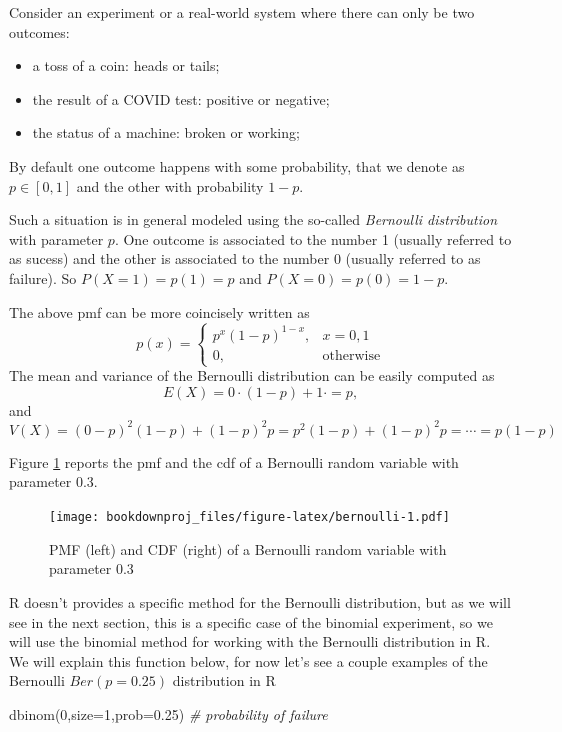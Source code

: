 \documentclass[
]{book}
\newenvironment{Shaded}{\begin{snugshade}}{\end{snugshade}}
\newcommand{\AttributeTok}[1]{\textcolor[rgb]{0.77,0.63,0.00}{#1}}
\newcommand{\CommentTok}[1]{\textcolor[rgb]{0.56,0.35,0.01}{\textit{#1}}}
\newcommand{\DecValTok}[1]{\textcolor[rgb]{0.00,0.00,0.81}{#1}}
\newcommand{\FloatTok}[1]{\textcolor[rgb]{0.00,0.00,0.81}{#1}}
\newcommand{\FunctionTok}[1]{\textcolor[rgb]{0.00,0.00,0.00}{#1}}
\newcommand{\NormalTok}[1]{#1}
\theoremstyle{definition}
\theoremstyle{definition}
\theoremstyle{definition}
\theoremstyle{definition}
\theoremstyle{remark}
\begin{document}
Consider an experiment or a real-world system where there can only be two outcomes:

\begin{itemize}
\item
  a toss of a coin: heads or tails;
\item
  the result of a COVID test: positive or negative;
\item
  the status of a machine: broken or working;
\end{itemize}

By default one outcome happens with some probability, that we denote as \(p\in [0,1]\) and the other with probability \(1-p\).

Such a situation is in general modeled using the so-called \emph{Bernoulli distribution} with parameter \(p\). One outcome is associated to the number 1 (usually referred to as sucess) and the other is associated to the number 0 (usually referred to as failure). So \(P(X=1)=p(1)=p\) and \(P(X=0)=p(0)=1-p\).

The above pmf can be more coincisely written as
\[
p(x)=\left\{
\begin{array}{ll}
p^x(1-p)^{1-x}, & x=0,1\\
0, & \mbox{otherwise}
\end{array}
\right.
\]
The mean and variance of the Bernoulli distribution can be easily computed as
\[
E(X)=0\cdot(1-p)+ 1\cdotp=p,
\]
and
\[
V(X)=(0-p)^2(1-p)+(1-p)^2p=p^2(1-p)+(1-p)^2p=\cdots = p(1-p)
\]

Figure \ref{fig:bernoulli} reports the pmf and the cdf of a Bernoulli random variable with parameter 0.3.

\begin{figure}
\centering
\texttt{[image: bookdownproj\_files/figure-latex/bernoulli-1.pdf]}
\caption{\label{fig:bernoulli}PMF (left) and CDF (right) of a Bernoulli random variable with parameter 0.3}
\end{figure}

R doesn't provides a specific method for the Bernoulli distribution, but as we will see in the next section, this is a specific case of the binomial experiment, so we will use the binomial method for working with the Bernoulli distribution in R. We will explain this function below, for now let's see a couple examples of the Bernoulli \(Ber(p=0.25)\) distribution in R

\begin{Shaded}
\begin{Highlighting}[]
\FunctionTok{dbinom}\NormalTok{(}\DecValTok{0}\NormalTok{,}\AttributeTok{size=}\DecValTok{1}\NormalTok{,}\AttributeTok{prob=}\FloatTok{0.25}\NormalTok{) }\CommentTok{\# probability of failure}
\end{Highlighting}
\end{Shaded}
\end{document}
